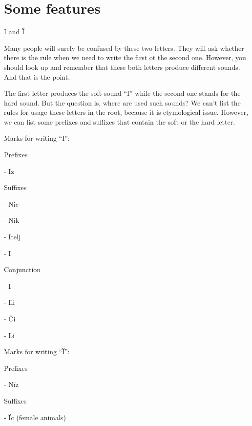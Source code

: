 \section{Some features}

I and Ï

Many people will surely be confused by these two letters. They will ask whether there is the rule when we need to write the first ot the second one. However, you should look up and remember that these both letters produce different sounds. And that is the point. 

The first letter produces the soft sound “I” while the second one stands for the hard sound. But the question is, where are used such sounds? We can't list the rules for usage these letters in the root, because it is etymological issue. However, we can list some prefixes and suffixes that contain the soft or the hard letter.

Marks for writing “I”:

Prefixes 

- Iz

Suffixes

- Nic

- Nik

- Itelj

- I

Conjunction

- I

- Ili

- Či

- Li

Marks for writing “Ï”:

Prefixes

- Nïz

Suffixes

- Ïc (female animals)
